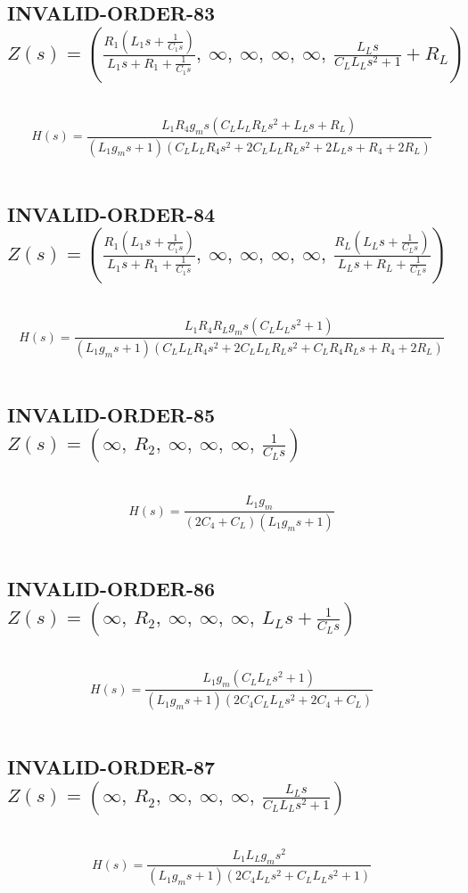 \documentclass{article}
\begin{document}
\subsection{INVALID-ORDER-83 $Z(s) = \left( \frac{R_{1} \left(L_{1} s + \frac{1}{C_{1} s}\right)}{L_{1} s + R_{1} + \frac{1}{C_{1} s}}, \  \infty, \  \infty, \  \infty, \  \infty, \  \frac{L_{L} s}{C_{L} L_{L} s^{2} + 1} + R_{L}\right)$ } \ 
\textbf{\[H(s) = \frac{L_{1} R_{4} g_{m} s \left(C_{L} L_{L} R_{L} s^{2} + L_{L} s + R_{L}\right)}{\left(L_{1} g_{m} s + 1\right) \left(C_{L} L_{L} R_{4} s^{2} + 2 C_{L} L_{L} R_{L} s^{2} + 2 L_{L} s + R_{4} + 2 R_{L}\right)}\] } \ 
\subsection{INVALID-ORDER-84 $Z(s) = \left( \frac{R_{1} \left(L_{1} s + \frac{1}{C_{1} s}\right)}{L_{1} s + R_{1} + \frac{1}{C_{1} s}}, \  \infty, \  \infty, \  \infty, \  \infty, \  \frac{R_{L} \left(L_{L} s + \frac{1}{C_{L} s}\right)}{L_{L} s + R_{L} + \frac{1}{C_{L} s}}\right)$ } \ 
\textbf{\[H(s) = \frac{L_{1} R_{4} R_{L} g_{m} s \left(C_{L} L_{L} s^{2} + 1\right)}{\left(L_{1} g_{m} s + 1\right) \left(C_{L} L_{L} R_{4} s^{2} + 2 C_{L} L_{L} R_{L} s^{2} + C_{L} R_{4} R_{L} s + R_{4} + 2 R_{L}\right)}\] } \ 
\subsection{INVALID-ORDER-85 $Z(s) = \left( \infty, \  R_{2}, \  \infty, \  \infty, \  \infty, \  \frac{1}{C_{L} s}\right)$ } \ 
\textbf{\[H(s) = \frac{L_{1} g_{m}}{\left(2 C_{4} + C_{L}\right) \left(L_{1} g_{m} s + 1\right)}\] } \ 
\subsection{INVALID-ORDER-86 $Z(s) = \left( \infty, \  R_{2}, \  \infty, \  \infty, \  \infty, \  L_{L} s + \frac{1}{C_{L} s}\right)$ } \ 
\textbf{\[H(s) = \frac{L_{1} g_{m} \left(C_{L} L_{L} s^{2} + 1\right)}{\left(L_{1} g_{m} s + 1\right) \left(2 C_{4} C_{L} L_{L} s^{2} + 2 C_{4} + C_{L}\right)}\] } \ 
\subsection{INVALID-ORDER-87 $Z(s) = \left( \infty, \  R_{2}, \  \infty, \  \infty, \  \infty, \  \frac{L_{L} s}{C_{L} L_{L} s^{2} + 1}\right)$ } \ 
\textbf{\[H(s) = \frac{L_{1} L_{L} g_{m} s^{2}}{\left(L_{1} g_{m} s + 1\right) \left(2 C_{4} L_{L} s^{2} + C_{L} L_{L} s^{2} + 1\right)}\] } \ 
\end{document}
